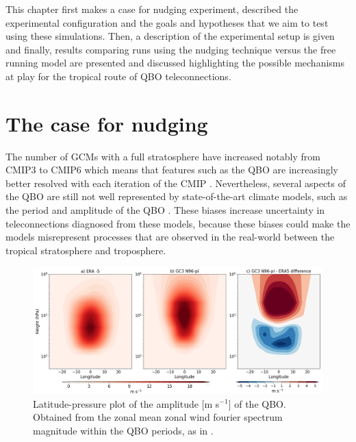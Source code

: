 This chapter first makes a case for nudging experiment, described the experimental configuration and the goals and hypotheses that we aim to test using these simulations. 
Then, a description of the experimental setup is given and finally, results comparing runs using the nudging technique versus the free running model are presented and discussed highlighting the possible mechanisms at play for the tropical route of QBO teleconnections. 

\section{The case for nudging}
%

The number of GCMs with a full stratosphere have increased notably from CMIP3 to CMIP6 which means that features such as the QBO are increasingly better resolved with each iteration of the CMIP \citep{bushell2020,richter2020}. Nevertheless, several aspects of the QBO are still not well represented by state-of-the-art climate models, such as the period and amplitude of the QBO \citep{schenzinger2017,richter2020}. 
These biases increase uncertainty in teleconnections diagnosed from these models, because these biases could make the models misrepresent processes that are observed in the real-world between the tropical stratosphere and troposphere.

\begin{figure}[t!]
\centering
 \includegraphics[width=\linewidth]{figures/qboamplitude.png}
\caption[QBO amplitude bias]{Latitude-pressure plot of the amplitude [m s$^{-1}$] of the QBO. Obtained from the zonal mean zonal wind fourier spectrum magnitude within the QBO periods, as in \cite{schenzinger2017}. }
\label{fig:qboamplitude}
\end{figure}

